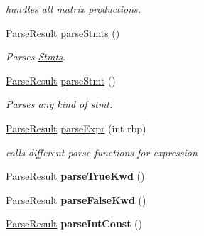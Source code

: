 \begin{DoxyCompactItemize}
\begin{DoxyCompactList}\small\item\em handles all matrix productions. \end{DoxyCompactList}\item 
\hypertarget{classParser_a452db3def31683cb0305e57a01489bd4}{\hyperlink{classParseResult}{Parse\-Result} \hyperlink{classParser_a452db3def31683cb0305e57a01489bd4}{parse\-Stmts} ()}\label{classParser_a452db3def31683cb0305e57a01489bd4}

\begin{DoxyCompactList}\small\item\em Parses \hyperlink{classStmts}{Stmts}. \end{DoxyCompactList}\item 
\hypertarget{classParser_a9709c4793d0cce012d595f3ee416cd25}{\hyperlink{classParseResult}{Parse\-Result} \hyperlink{classParser_a9709c4793d0cce012d595f3ee416cd25}{parse\-Stmt} ()}\label{classParser_a9709c4793d0cce012d595f3ee416cd25}

\begin{DoxyCompactList}\small\item\em Parses any kind of stmt. \end{DoxyCompactList}\item 
\hypertarget{classParser_a50227dc24dc7a175ac0533d9957dfcf8}{\hyperlink{classParseResult}{Parse\-Result} \hyperlink{classParser_a50227dc24dc7a175ac0533d9957dfcf8}{parse\-Expr} (int rbp)}\label{classParser_a50227dc24dc7a175ac0533d9957dfcf8}

\begin{DoxyCompactList}\small\item\em calls different parse functions for expression \end{DoxyCompactList}\item 
\hypertarget{classParser_ad40f1e5e4c66814f959d982f94b767a3}{\hyperlink{classParseResult}{Parse\-Result} {\bfseries parse\-True\-Kwd} ()}\label{classParser_ad40f1e5e4c66814f959d982f94b767a3}

\item 
\hypertarget{classParser_a56f03d2e70d12648c55ce56a11e63324}{\hyperlink{classParseResult}{Parse\-Result} {\bfseries parse\-False\-Kwd} ()}\label{classParser_a56f03d2e70d12648c55ce56a11e63324}

\item 
\hypertarget{classParser_a2b200b744e5bedf82ef6f610d7877cfc}{\hyperlink{classParseResult}{Parse\-Result} {\bfseries parse\-Int\-Const} ()}\label{classParser_a2b200b744e5bedf82ef6f610d7877cfc}


\end{DoxyCompactItemize}
